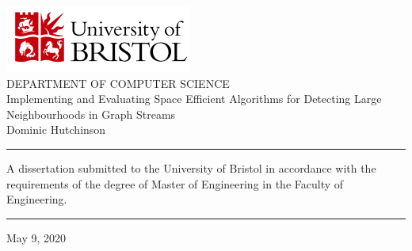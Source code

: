 \documentclass[11pt,twoside,a4paper]{report}
\begin{document}
\renewcommand\thetable{\arabic{table}} %
\renewcommand{\thefigure}{\arabic{chapter}.\arabic{section}.\arabic{figure}}

\renewcommand{\headrulewidth}{0pt}
\newcommand{\ie}{\textit{i.e.} }
\newcommand{\nats}{\mathbb{N} }
\newcommand{\horizontalline}{\newline\vspace{.3cm}\hfill\makebox[.5\linewidth]{\rule{.5\textwidth}{0.4pt}}\hfill\vspace{.05cm}}

\newcommand{\smallsim}{\smallsym{\mathrel}{\sim}}

\makeatletter
\newcommand{\smallsym}[2]{#1{\mathpalette\make@small@sym{#2}}}
\newcommand{\make@small@sym}[2]{%
  \vcenter{\hbox{$\m@th\downgrade@style#1#2$}}%
}
\newcommand{\downgrade@style}[1]{%
  \ifx#1\displaystyle\scriptstyle\else
    \ifx#1\textstyle\scriptstyle\else
      \scriptscriptstyle
  \fi\fi
}
\makeatother

\pagestyle{fancy}
\fancyhead[C]{}
\fancyhead[R]{\today}

\DontPrintSemicolon


\newpage
\thispagestyle{empty}


\vspace*{\fill}
\begin{center}
  \includegraphics[scale=1]{img/logo_uob_colour.PNG}\\
  \vspace*{1.0cm}
  DEPARTMENT OF COMPUTER SCIENCE\\
  \vspace*{2.0cm}
  {\LARGE Implementing and Evaluating Space Efficient Algorithms for Detecting Large Neighbourhoods in Graph Streams} \\
  \vspace*{1.0cm}
  {\Large Dominic Hutchinson}\\

  \vspace*{1.0cm}
  \rule{0.5\textwidth}{0.5pt}
  \vspace*{1.0cm}

  A dissertation submitted to the University of Bristol in accordance with the requirements of the degree of Master of Engineering in the Faculty of Engineering.

  \vspace*{1.0cm}
  \rule{0.5\textwidth}{0.5pt}
  \vspace*{1.0cm}

  May 9, 2020
\end{center}
\vspace*{\fill}
\end{document}
